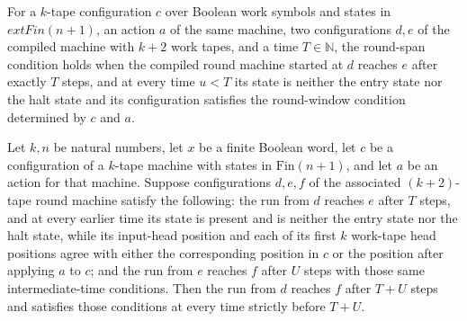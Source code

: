 \begin{definition}
\label{Turing.StepBlock.RoundSpan}
\leanok
{}
For a $k$-tape configuration $c$ over Boolean work symbols and states in
$	ext{Fin}(n+1)$, an action $a$ of the same machine, two configurations $d,e$ of the
compiled machine with $k+2$ work tapes, and a time $T\in\mathbb{N}$, the round-span
condition holds when the compiled round machine started at $d$ reaches $e$ after exactly
$T$ steps, and at every time $u<T$ its state is neither the entry state nor the halt
state and its configuration satisfies the round-window condition determined by $c$ and
$a$.
\end{definition}

\begin{lemma}
\label{Turing.StepBlock.RoundSpan.add}
\leanok
{}
Let $k,n$ be natural numbers, let $x$ be a finite Boolean word, let $c$ be a
configuration of a $k$-tape machine with states in $\mathrm{Fin}(n+1)$, and let $a$ be
an action for that machine. Suppose configurations $d,e,f$ of the associated
$(k+2)$-tape round machine satisfy the following: the run from $d$ reaches $e$ after $T$
steps, and at every earlier time its state is present and is neither the entry state nor
the halt state, while its input-head position and each of its first $k$ work-tape head
positions agree with either the corresponding position in $c$ or the position after
applying $a$ to $c$; and the run from $e$ reaches $f$ after $U$ steps with those same
intermediate-time conditions. Then the run from $d$ reaches $f$ after $T+U$ steps and
satisfies those conditions at every time strictly before $T+U$.
\end{lemma}

